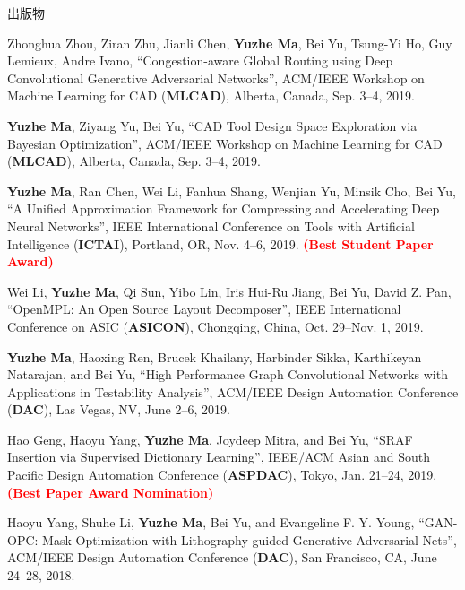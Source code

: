 \begin{rSection}{出版物}
\begin{description}[font=\normalfont]
\item[{[C11]}]{
    Zhonghua Zhou, Ziran Zhu, Jianli Chen, \textbf{Yuzhe Ma}, Bei Yu, Tsung-Yi Ho, Guy Lemieux, Andre Ivano,
    ``Congestion-aware Global Routing using Deep Convolutional Generative Adversarial Networks'',
    ACM/IEEE Workshop on Machine Learning for CAD (\textbf{MLCAD}), Alberta, Canada, Sep. 3--4, 2019.
}

\item[{[C10]}]{
    \textbf{Yuzhe Ma}, Ziyang Yu, Bei Yu,
    ``CAD Tool Design Space Exploration via Bayesian Optimization'',
    ACM/IEEE Workshop on Machine Learning for CAD (\textbf{MLCAD}), Alberta, Canada, Sep. 3--4, 2019.
}

\item[{[C9]}]{
    \textbf{Yuzhe Ma}, Ran Chen, Wei Li, Fanhua Shang, Wenjian Yu, Minsik Cho, Bei Yu,
    ``A Unified Approximation Framework for Compressing and Accelerating Deep Neural Networks'',
    IEEE International Conference on Tools with Artificial Intelligence (\textbf{ICTAI}), Portland, OR, Nov. 4--6, 2019.
    \textcolor{red}{\textbf{(Best Student Paper Award)}}
}

\item[{[C8]}]{
    Wei Li, \textbf{Yuzhe Ma}, Qi Sun, Yibo Lin, Iris Hui-Ru Jiang, Bei Yu, David Z. Pan,
    ``OpenMPL: An Open Source Layout Decomposer'',
    IEEE International Conference on ASIC (\textbf{ASICON}), Chongqing, China, Oct. 29--Nov. 1, 2019.
}

\item[{[C7]}]{
    \textbf{Yuzhe Ma}, Haoxing Ren, Brucek Khailany, Harbinder Sikka, Karthikeyan Natarajan, and Bei Yu,
    ``High Performance Graph Convolutional Networks with Applications in Testability Analysis'',
    ACM/IEEE Design Automation Conference (\textbf{DAC}), Las Vegas, NV, June 2--6, 2019.
}

\item[{[C6]}]{
    Hao Geng, Haoyu Yang, \textbf{Yuzhe Ma}, Joydeep Mitra, and Bei Yu,
    ``SRAF Insertion via Supervised Dictionary Learning'',
    IEEE/ACM Asian and South Pacific Design Automation Conference (\textbf{ASPDAC}), Tokyo, Jan. 21--24, 2019. \textbf{\textcolor{red}{(Best Paper Award Nomination)}}
}

\item[{[C5]}]{
    Haoyu Yang, Shuhe Li, \textbf{Yuzhe Ma}, Bei Yu, and Evangeline F. Y. Young,
    ``GAN-OPC: Mask Optimization with Lithography-guided Generative Adversarial Nets'',
    ACM/IEEE Design Automation Conference (\textbf{DAC}), San Francisco, CA, June 24--28, 2018.
}


\end{description}
\end{rSection}

